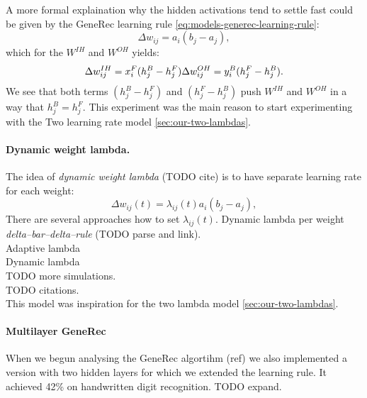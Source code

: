 A more formal explaination why the hidden activations tend to settle fast could be given by the GeneRec learning rule \ref{eq:models-generec-learning-rule}: 
\begin{equation} 
  \Delta w_{ij} = a_i(b_j - a_j),
\end{equation} 
which for the $W^{IH}$ and $W^{OH}$ yields: 
\begin{equation} 
  \Delta w_{ij}^{IH} = x^F_i(h^B_j - h^F_j) \\ 
  \Delta w_{ij}^{OH} = y^B_i(h^F_j - h^B_j). 
\end{equation} 
We see that both terms $(h^B_j - h^F_j)$ and $(h^F_j - h^B_j)$ push $W^{IH}$ and $W^{OH}$ in a way that $h^B_j = h^F_j$. This experiment was the main reason to start experimenting with the Two learning rate model \ref{sec:our-two-lambdas}. 

\paragraph{Dynamic weight lambda.} 
\label{our-dynamic-lambda} 
The idea of \emph{dynamic weight lambda} (TODO cite) is to have separate learning rate for each weight: 
\begin{equation}
\Delta w_{ij}(t) = \lambda_{ij}(t) a_i\left(b_j - a_j\right), 
\end{equation}
There are several approaches how to set $\lambda_{ij}(t)$. Dynamic lambda per weight \emph{delta--bar--delta--rule} \citep{jacobs1988increased} (TODO parse and link). \\
Adaptive lambda \citep{riedmiller1993direct} \\
Dynamic lambda \citep{yu1997efficient} \\ 
TODO more simulations.  \\
TODO citations.  \\
This model was inspiration for the two lambda model \ref{sec:our-two-lambdas}. 

\paragraph{Multilayer GeneRec}

When we begun analysing the GeneRec algortihm (ref) we also implemented a version with two hidden layers for which we extended the learning rule. It achieved 42\% on handwritten digit recognition. 
TODO expand. 


